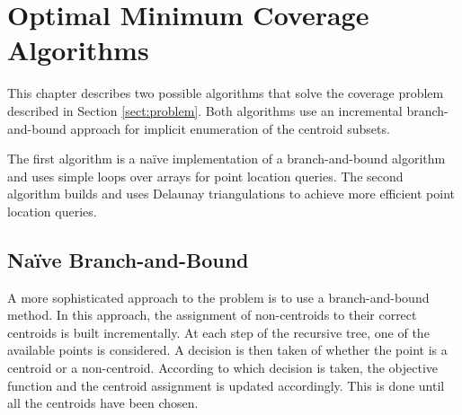 \cleardoublepage
\chapter{Optimal Minimum Coverage Algorithms}
\label{chap:algos}

This chapter describes two possible algorithms that solve the coverage problem described in Section \ref{sect:problem}. Both algorithms use an incremental branch-and-bound approach for implicit enumeration of the centroid subsets. 

The first algorithm is a naïve implementation of a branch-and-bound algorithm and uses simple loops over arrays for point location queries. The second algorithm builds and uses Delaunay triangulations to achieve more efficient point location queries.

\section{Naïve Branch-and-Bound}
\label{alg:bb}

A more sophisticated approach to the problem is to use a branch-and-bound method.
In this approach, the assignment of non-centroids to their correct centroids is built incrementally.
At each step of the recursive tree, one of the available points is considered. A decision is then taken of whether the point is a centroid or a non-centroid. According to which decision is taken, the objective function and the centroid assignment is updated accordingly. This is done until all the centroids have been chosen.
